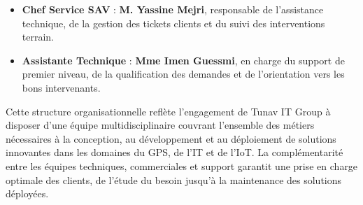 \documentclass[12pt,a4paper]{report}
\begin{document}
\begin{itemize}
    \item \textbf{Chef Service SAV} : \textbf{M. Yassine Mejri}, responsable de l'assistance technique, de la gestion des tickets clients et du suivi des interventions terrain.
    
    \item \textbf{Assistante Technique} : \textbf{Mme Imen Guessmi}, en charge du support de premier niveau, de la qualification des demandes et de l'orientation vers les bons intervenants.
\end{itemize}

\noindent Cette structure organisationnelle reflète l'engagement de Tunav IT Group à disposer d'une équipe multidisciplinaire couvrant l'ensemble des métiers nécessaires à la conception, au développement et au déploiement de solutions innovantes dans les domaines du GPS, de l'IT et de l'IoT. La complémentarité entre les équipes techniques, commerciales et support garantit une prise en charge optimale des clients, de l'étude du besoin jusqu'à la maintenance des solutions déployées.
\end{document}
